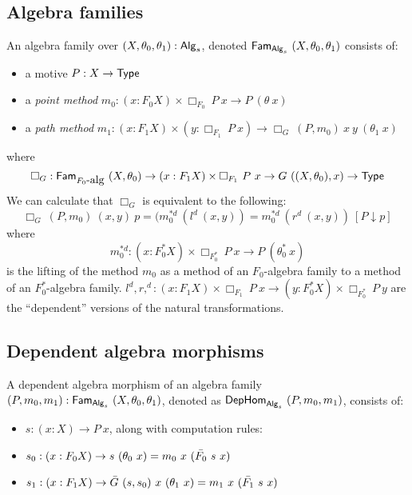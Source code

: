 \documentclass[a4paper,10pt]{report}
\begin{document}
\subsection{Algebra families}

\begin{defn}
  An algebra family over $(X,\theta_0,\theta_1) : \mathsf{Alg}_s$, denoted
  $\mathsf{Fam}_{\mathsf{Alg}_s}\ (X,\theta_0,\theta_1)$ consists of:

  \begin{itemize}
  \item a motive $P : X \to \mathsf{Type}$
  \item a \emph{point method} $m_0 : (x : F_0 X) \times \Box_{F_0}\  P\ x \to P\ (\theta\ x)$
  \item a \emph{path method} $m_1 : (x : F_1 X) \times (y : \Box_{F_1}\ P\ x) \to \Box_G\ (P,m_0)\ x\ y\ (\theta_1\ x)$
  \end{itemize}
\end{defn}
where
$$
\Box_G : \famover{\algcat{F_0}}{(X,\theta_0)} \to (x : F_1 X) \times \Box_{F_1}\ P\ x \to G\ ((X,\theta_0),x) \to \Type
$$
We can calculate that $\Box_G$ is equivalent to the following:
$$
\Box_G\ (P,m_0)\ (x, y)\ p = (m_0^{*d}\ (l^d\ (x , y)) = m_0^{*d}\ (r^d\ (x , y))\ [ P \downarrow p ]
$$
where
$$
m_0^{*d} : (x : F_0^* X) \times \Box_{F_0^*}\ P\ x \to P\ (\theta_0^*\ x)
$$
is the lifting of the method $m_0$ as a method of an $F_0$-algebra
family to a method of an $F_0^*$-algebra family.
$l^d, r,^d : (x : F_1 X) \times \Box_{F_1}\ P\ x \to (y : F_0^* X)
\times \Box_{F_0^*}\ P\ y$
are the ``dependent'' versions of the natural transformations.


\subsection{Dependent algebra morphisms}

\begin{defn}
  A dependent algebra morphism of an algebra family
  $(P,m_0,m_1) : \mathsf{Fam}_{\mathsf{Alg}_s}\ (X,\theta_0,\theta_1)$, denoted as
  $\mathsf{DepHom}_{\mathsf{Alg}_s}\ (P,m_0,m_1)$, consists of:

  \begin{itemize}
  \item $s : (x : X) \to P\ x$, along with computation rules:
  \item $s_0 : (x : F_0 X) \to s\ (\theta_0\ x) = m_0\ x\ (\bar{F_0}\ s\ x)$
  \item $s_1 : (x : F_1 X) \to \actionsection{G}\ (s,s_0)\ x\ (\theta_1\ x) = m_1\ x\ (\actionsection{F_1}\ s\ x)$
  \end{itemize}
\end{defn}
\end{document}
